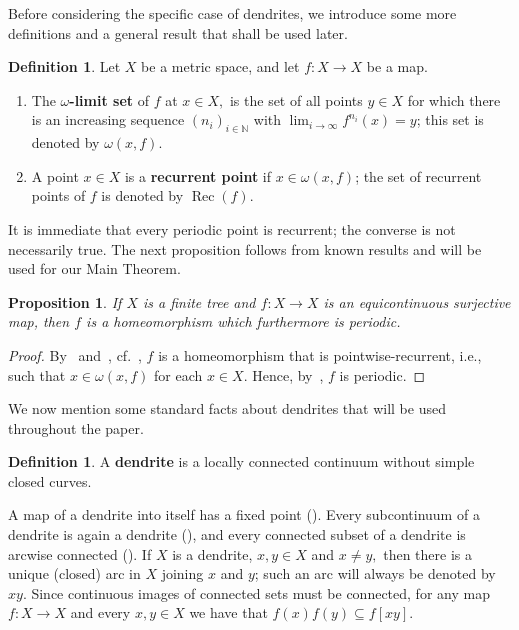 \documentclass[12pt]{amsart}
\newtheorem{proposition}[theorem]{Proposition}
\theoremstyle{definition}
\newtheorem{definition}[theorem]{Definition}
\numberwithin{equation}{section}
\DeclareMathOperator{\rec}{Rec}
\begin{document}
Before considering the specific case of dendrites, we introduce some more definitions and a general result that 
shall be used later.

\begin{definition}\label{def:moved}
Let $X$ be a metric space, and let $f \colon X\longrightarrow X$ be a map.
\begin{enumerate}
\item The {\bf $\omega$-limit set} of $f$ at $x \in X,$ is the set of all points $y \in X$ for which there is an increasing 
         sequence $(n_i)_{i \in \mathbb N}$ with $\lim_{i \to \infty}f^{n_i}(x) = y$; this set is denoted by $\omega(x,f)$.
\item A point $x\in X$ is a {\bf recurrent point} if $x\in\omega(x,f)$; the set of recurrent points of $f$ is denoted by
         $\rec(f)$.
\end{enumerate}
\end{definition}

It is immediate that every periodic point is recurrent; the converse is not necessarily true. The next proposition follows from known results and will be used for our Main Theorem.

\begin{proposition}\label{nuevo1}
If $X$ is a finite tree and $f \colon X\longrightarrow X$ is an equicontinuous surjective map, then $f$ is a homeomorphism which furthermore is periodic.
\end{proposition}
\begin{proof}
By~\cite[Proposition~2.4]{mai} and~\cite[Corollary~8]{bruckner-hu}, cf.~\cite[Corollary~3.2]{mai}, $f$ is a homeomorphism that is pointwise-recurrent, i.e., such that $x \in \omega (x,f)$ for each $x \in X$. 
Hence, by~\cite[Theorem~4.4]{mai2}, $f$ is periodic.
\end{proof}

We now mention some standard facts about dendrites that will be used throughout the paper.

\begin{definition}
A {\bf dendrite} is a locally connected continuum without simple closed curves. 
\end{definition}

A map of a dendrite into itself has a fixed point (\cite[Theorem~10.31]{nadler}). Every subcontinuum of a dendrite is again a dendrite (\cite[Corollary~10.6]{nadler}), and every connected subset of a dendrite is arcwise connected (\cite[Proposition~10.9]{nadler}). If $X$ is a dendrite, $x,y\in X$ and $x \ne y,$ then there is a unique (closed) arc in $X$ joining $x$ and $y$; such an arc will always be denoted by $xy$. Since continuous images of connected sets must be connected, for any map $f \colon X\longrightarrow X$ and every $x,y\in X$ we have that $f(x)f(y)\subseteq f[xy]$.
\end{document}
